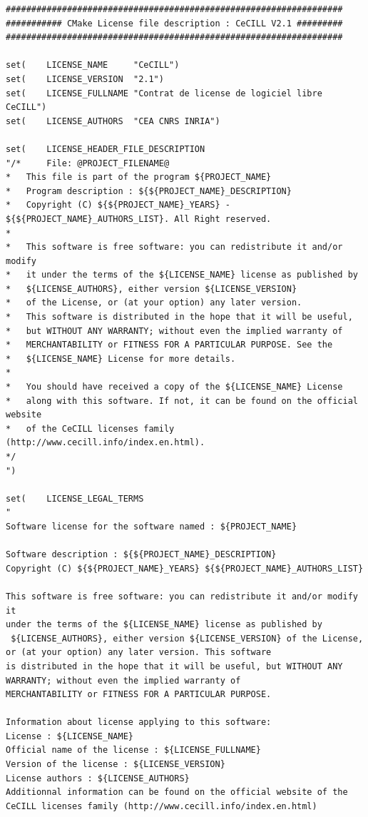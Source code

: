 \documentclass[12pt,a4paper]{article}
\begin{document}
\begin{verbatim}
##################################################################
########### CMake License file description : CeCILL V2.1 #########
##################################################################

set(	LICENSE_NAME     "CeCILL")
set(	LICENSE_VERSION  "2.1")
set(	LICENSE_FULLNAME "Contrat de license de logiciel libre CeCILL")
set(	LICENSE_AUTHORS  "CEA CNRS INRIA")

set(	LICENSE_HEADER_FILE_DESCRIPTION 
"/* 	File: @PROJECT_FILENAME@ 	
*	This file is part of the program ${PROJECT_NAME}
*  	Program description : ${${PROJECT_NAME}_DESCRIPTION}
*  	Copyright (C) ${${PROJECT_NAME}_YEARS} - ${${PROJECT_NAME}_AUTHORS_LIST}. All Right reserved.
*
*	This software is free software: you can redistribute it and/or modify
*	it under the terms of the ${LICENSE_NAME} license as published by
*	${LICENSE_AUTHORS}, either version ${LICENSE_VERSION} 
*	of the License, or (at your option) any later version.
*	This software is distributed in the hope that it will be useful,
*	but WITHOUT ANY WARRANTY; without even the implied warranty of
*	MERCHANTABILITY or FITNESS FOR A PARTICULAR PURPOSE. See the
*	${LICENSE_NAME} License for more details.
*
*	You should have received a copy of the ${LICENSE_NAME} License
*	along with this software. If not, it can be found on the official website 
*	of the CeCILL licenses family (http://www.cecill.info/index.en.html).
*/
")

set(	LICENSE_LEGAL_TERMS
"
Software license for the software named : ${PROJECT_NAME}

Software description : ${${PROJECT_NAME}_DESCRIPTION}
Copyright (C) ${${PROJECT_NAME}_YEARS} ${${PROJECT_NAME}_AUTHORS_LIST}

This software is free software: you can redistribute it and/or modify it 
under the terms of the ${LICENSE_NAME} license as published by
 ${LICENSE_AUTHORS}, either version ${LICENSE_VERSION} of the License, or (at your option) any later version. This software 
is distributed in the hope that it will be useful, but WITHOUT ANY WARRANTY; without even the implied warranty of 
MERCHANTABILITY or FITNESS FOR A PARTICULAR PURPOSE. 

Information about license applying to this software:
License : ${LICENSE_NAME}
Official name of the license : ${LICENSE_FULLNAME} 
Version of the license : ${LICENSE_VERSION}
License authors : ${LICENSE_AUTHORS}
Additionnal information can be found on the official website of the CeCILL licenses family (http://www.cecill.info/index.en.html)


\end{verbatim}
\end{document}
